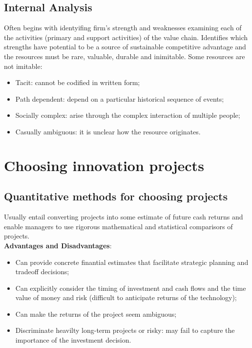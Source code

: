 \documentclass[12pt]{article}
\begin{document}
\subsection{Internal Analysis}
Often begins with identyifing firm's strength and weaknesses examining  each of the activities (primary and support activities) of the value chain.
Identifies which strengths have potential to be a source of sustainable competitive advantage and the resources must be rare, valuable, durable and inimitable.
Some resources are not imitable:
\begin{itemize}
    \item Tacit: cannot be codified in written form;
    \item Path dependent: depend on a particular historical sequence of events;
    \item Socially complex: arise through the complex interaction of multiple people;
    \item Casually ambiguous: it is unclear how the resource originates.
\end{itemize}
\section{Choosing innovation projects}
\subsection{Quantitative methods for choosing projects}
Usually entail converting projects into some estimate of future cash returns and enable managers to use rigorous mathematical and statistical comparisors of projects. \\
\textbf{Advantages and Disadvantages}:
\begin{itemize}
    \item Can provide concrete finantial estimates that facilitate strategic planning and tradeoff decisions;
    \item Can explicitly consider the timing of investment and cash flows and the time value of money and risk (difficult to anticipate returns of the technology);
    \item Can make the returns of the project seem ambiguous;
    \item Discriminate heavilty long-term projects or risky: may fail to capture the importance of the investment decision.
\end{itemize}
\end{document}
